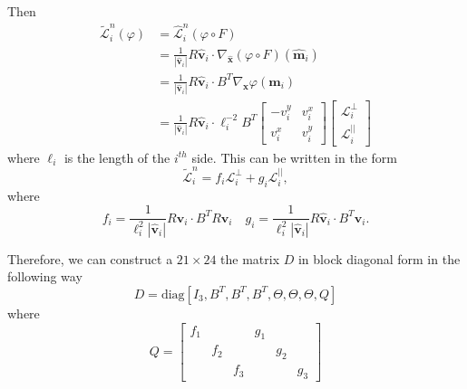 Then 
\begin{align*}
  \tilde{\mathcal{L}}^n_i(\varphi) &= \hat{\mathcal{L}}^n_i(\varphi\circ F) \\
  &= \frac{1}{|\hat{\mathbf{v}}_i|}R \hat{\mathbf{v}}_i \cdot
    \nabla_{\hat{\mathbf{x}}}(\varphi \circ F)(\hat{\mathbf{m}}_i) \\
  &= \frac{1}{|\hat{\mathbf{v}}_i|}R \hat{\mathbf{v}}_i \cdot B^T
    \nabla_{\mathbf{x}} \varphi(\mathbf{m}_i) \\
  &= \frac{1}{|\hat{\mathbf{v}}_i|}R \hat{\mathbf{v}}_i \cdot \ell_i^{-2} B^T
  \begin{bmatrix} -v^y_i & v^x_i \\ v^x_i & v^y_i \end{bmatrix}
  \begin{bmatrix}
    \mathcal{L}^{\perp}_i \\ \mathcal{L}^{||}_i
  \end{bmatrix}
\end{align*}
where $\ell_i$ is the length of the $i^{th}$ side. This can be written in the form
\begin{equation*}
  \tilde{\mathcal{L}}_i^n = f_i \mathcal{L}^{\perp}_i + g_i \mathcal{L}^{||}_i,
\end{equation*}
where
\begin{equation*}
  f_i = \frac{1}{\ell_i^2 |\hat{\mathbf{v}}_i|}R \hat{\mathbf{v}}_i \cdot B^T
    R\mathbf{v}_i \quad
  g_i = \frac{1}{\ell_i^2 |\hat{\mathbf{v}}_i|}R \hat{\mathbf{v}}_i \cdot B^T
    \mathbf{v}_i .
\end{equation*}

Therefore, we can construct a $21\times 24$ the matrix $D$ in block diagonal
form in the following way
\begin{equation*}
  D = \text{diag}[I_3, B^T, B^T, B^T, \Theta, \Theta, \Theta, Q]
\end{equation*}
where 
\begin{equation*}
  Q = \left[\begin{array}{ccc|ccc}
    f_1 & & & g_1 & & \\
    & f_2 & & & g_2 &\\
    & & f_3 & & & g_3
  \end{array}\right]
\end{equation*}

